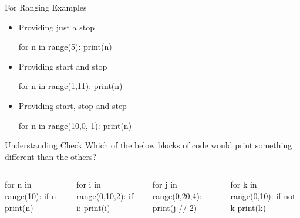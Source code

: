 \documentclass[pdf, aspectratio=169, 12pt]{beamer}
\begin{document}
\begin{frame}[fragile]{For Ranging Examples}
	\begin{itemize}
		\item Providing just a stop
			\begin{pythoncode}
				for n in range(5):
					print(n)
			\end{pythoncode}
		\item Providing start and stop
			\begin{pythoncode}
				for n in range(1,11):
					print(n)
			\end{pythoncode}
		\item Providing start, stop and step
			\begin{pythoncode}
				for n in range(10,0,-1):
					print(n)
			\end{pythoncode}
	\end{itemize}
\end{frame}

\begin{frame}[fragile]{Understanding Check}
	Which of the below blocks of code would print something different than the others?
	\begin{poll}
		\small
		\begin{columns}[t]
	\item 
		\begin{pythoncode}
			for n in range(10):
				if n %
					print(n)
		\end{pythoncode}

	\item
		\begin{pythoncode}
			for i in range(0,10,2):
				if i:
					print(i)
		\end{pythoncode}
			
	\item
		\begin{pythoncode}[showlines=true]
			for j in range(0,20,4):
				print(j // 2)
				  
		\end{pythoncode}

	\item
		\begin{pythoncode}
			for k in range(0,10):
				if not k %
					print(k)
		\end{pythoncode}
			
		\end{columns}

	\end{poll}
\end{frame}
\end{document}
